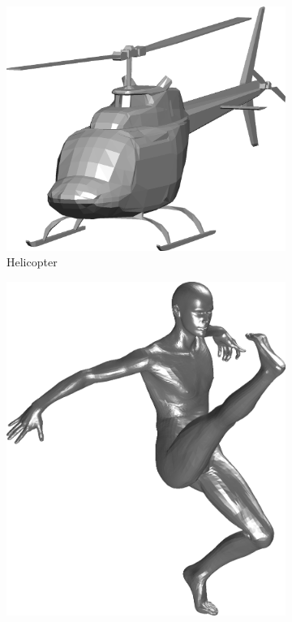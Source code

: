 \begin{figure}
	\begin{subfigure}[t]{0.19\linewidth} \centering
		\includegraphics[width=1\linewidth]{./fig/eval/13helicopter.png}  
		\caption{Helicopter} 	
	\end{subfigure}
	\begin{subfigure}[t]{0.19\linewidth} \centering
		\includegraphics[width=0.8\linewidth]{./fig/eval/14man.png}  

\end{subfigure}
\end{figure}

